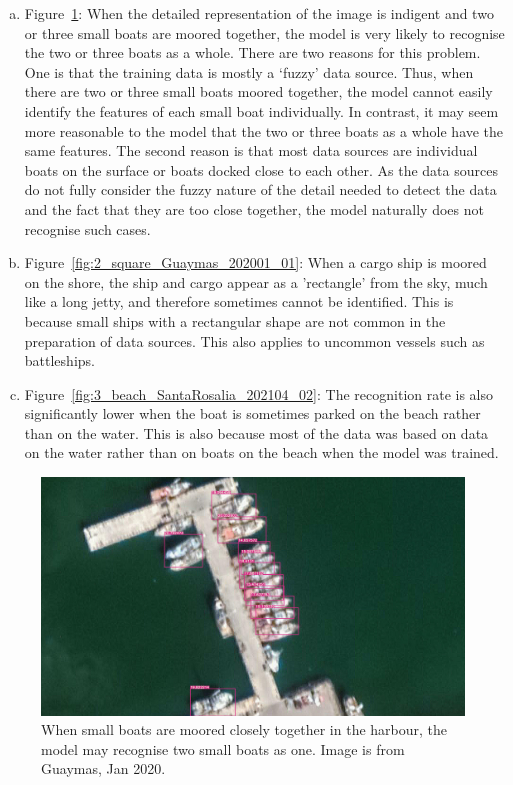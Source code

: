 \begin{enumerate}[(a)]
    \item  Figure~\ref{fig:1_docked_together_Guaymas_202001_20}: When the detailed representation of the image is indigent and two or three small boats are moored together, the model is very likely to recognise the two or three boats as a whole. There are two reasons for this problem. One is that the training data is mostly a `fuzzy' data source. Thus, when there are two or three small boats moored together, the model cannot easily identify the features of each small boat individually. In contrast, it may seem more reasonable to the model that the two or three boats as a whole have the same features. The second reason is that most data sources are individual boats on the surface or boats docked close to each other. As the data sources do not fully consider the fuzzy nature of the detail needed to detect the data and the fact that they are too close together, the model naturally does not recognise such cases.
    
    \item Figure~\ref{fig:2_square_Guaymas_202001_01}: When a cargo ship is moored on the shore, the ship and cargo appear as a 'rectangle' from the sky, much like a long jetty, and therefore sometimes cannot be identified. This is because small ships with a rectangular shape are not common in the preparation of data sources. This also applies to uncommon vessels such as battleships. 

    \item Figure~\ref{fig:3_beach_SantaRosalia_202104_02}: The recognition rate is also significantly lower when the boat is sometimes parked on the beach rather than on the water. This is also because most of the data was based on data on the water rather than on boats on the beach when the model was trained.

\end{enumerate}

\begin{figure}[h!]
    \centering
    \includegraphics[scale=0.105]{img/1_docked_together_Guaymas_202001_20.jpg}
    \caption{When small boats are moored closely together in the harbour, the model may recognise two small boats as one. Image is from Guaymas, Jan 2020.}
    \label{fig:1_docked_together_Guaymas_202001_20}
\end{figure}


